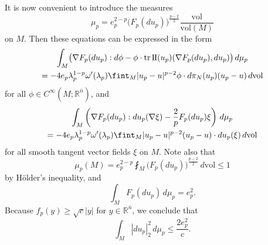 \documentclass[a4paper]{article}
\newcommand{\R}{\mathbb{R}}
\newcommand{\vol}{\mathrm{vol}}
\newcommand{\ndim}{{\bar{n}}}
\newcommand{\sff}{\mathrm{I{\mkern -1mu}I}}
\let\div\relax\DeclareMathOperator{\div}{div}
\DeclareMathOperator{\tr}{tr}
\theoremstyle{definition}
\theoremstyle{remark}
\begin{document}
It is now convenient to introduce the measures
\[
\mu_p = e_p^{2 - p} \bigl(F_p(du_p)\bigr)^{\frac{p - 2}{2}} \frac{\vol}{\vol(M)}
\]
on $M$. Then these equations can be expressed in the form
\begin{multline} \label{eq:Euler-Lagrange-L}
\int_M \bigl(\nabla F_p(du_p) : d\phi - \phi \cdot \tr \sff(u_p)(\nabla F_p(du_p), du_p)\bigr) \, d\mu_p \\
= - 4 e_p \lambda_p^{1 - p} \omega'(\lambda_p) \fint_M |u_p - u|^{p - 2} \phi \cdot d\pi_N(u_p)(u_p - u) \, d\vol
\end{multline}
for all $\phi \in C^\infty(M; \R^\ndim)$, and
\begin{multline} \label{eq:inner-variations-L}
\int_M \left(\nabla F_p(du_p) : du_p(\nabla \xi) - \frac{2}{p} F_p(du_p) \div \xi\right) \, d\mu_p \\
= - 4e_p \lambda_p^{1 - p} \omega'(\lambda_p) \fint_M |u_p - u|^{p - 2} (u_p - u) \cdot du_p(\xi) \, d\vol
\end{multline}
for all smooth tangent vector fields $\xi$ on $M$.
Note also that
\[
\mu_p(M) = e_p^{2 - p} \fint_M \bigl(F_p(du_p)\bigr)^{\frac{p - 2}{2}} \, d\vol \le 1
\]
by H\"older's inequality, and
\[
\int_M F_p(du_p) \, d\mu_p = e_p^2.
\]
Because $f_p(y) \ge \sqrt{c}|y|$ for $y \in \R^\ndim$, we conclude that
\[
\int_M |du_p|_2^2 \, d\mu_p \le \frac{2e_p^2}{c}.
\]
\end{document}
